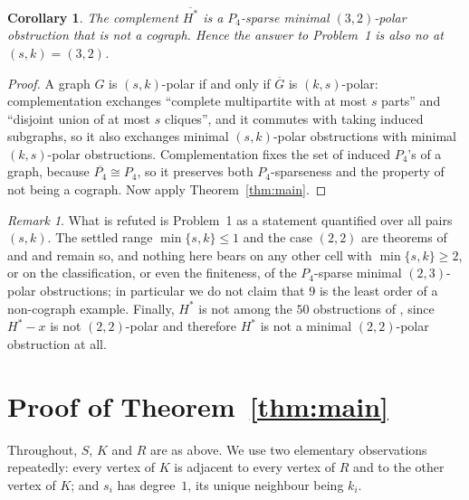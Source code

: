 \documentclass[11pt]{amsart}
\newtheorem{corollary}[theorem]{Corollary}
\theoremstyle{definition}
\theoremstyle{remark}
\newtheorem*{remark}{Remark}
\newcommand{\Hstar}{H^{*}}
\begin{document}
\begin{corollary}\label{cor:dual}
The complement $\overline{\Hstar}$ is a $P_4$-sparse minimal $(3,2)$-polar obstruction that is
not a cograph. Hence the answer to Problem~1 is also \emph{no} at $(s,k)=(3,2)$.
\end{corollary}

\begin{proof}
A graph $G$ is $(s,k)$-polar if and only if $\overline G$ is $(k,s)$-polar: complementation
exchanges ``complete multipartite with at most $s$ parts'' and ``disjoint union of at most $s$
cliques'', and it commutes with taking induced subgraphs, so it also exchanges minimal
$(s,k)$-polar obstructions with minimal $(k,s)$-polar obstructions. Complementation fixes the
set of induced $P_4$'s of a graph, because $\overline{P_4}\cong P_4$, so it preserves both
$P_4$-sparseness and the property of not being a cograph. Now apply
Theorem~\ref{thm:main}.
\end{proof}

\begin{remark}
What is refuted is Problem~1 as a statement quantified over all pairs $(s,k)$. The settled
range $\min\{s,k\}\le1$ and the case $(2,2)$ are theorems of \cite{CMHC24} and
\cite{CMHC22polar} and remain so, and nothing here bears on any other cell with
$\min\{s,k\}\ge2$, or on the classification, or even the finiteness, of the $P_4$-sparse
minimal $(2,3)$-polar obstructions; in particular we do not claim that $9$ is the least order
of a non-cograph example. Finally, $\Hstar$ is not among the $50$ obstructions of
\cite{CMHC22polar}, since $\Hstar-x$ is not $(2,2)$-polar and therefore $\Hstar$ is not a
minimal $(2,2)$-polar obstruction at all.
\end{remark}

\section{Proof of Theorem~\ref{thm:main}}

Throughout, $S$, $K$ and $R$ are as above. We use two elementary observations repeatedly:
every vertex of $K$ is adjacent to every vertex of $R$ and to the other vertex of $K$; and
$s_i$ has degree~$1$, its unique neighbour being $k_i$.
\end{document}
